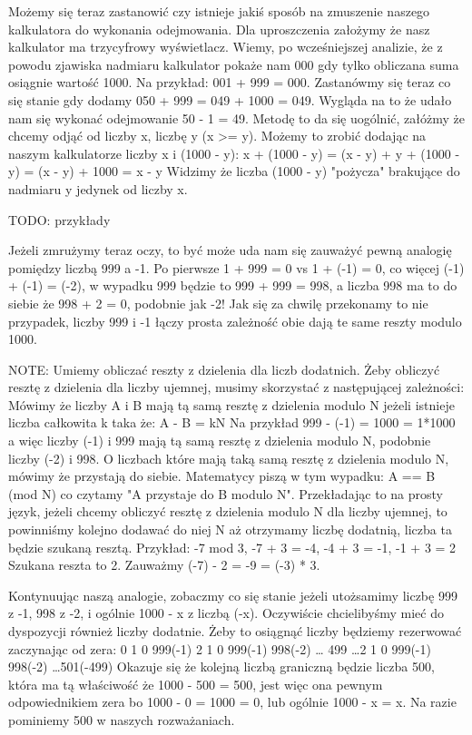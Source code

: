 Możemy się teraz zastanowić czy istnieje jakiś sposób na zmuszenie
naszego kalkulatora do wykonania odejmowania.
Dla uproszczenia założymy że nasz kalkulator ma trzycyfrowy wyświetlacz.
Wiemy, po wcześniejszej analizie, że z powodu zjawiska nadmiaru
kalkulator pokaże nam 000 gdy tylko obliczana suma osiągnie wartość 1000.
Na przykład: 001 + 999 = 000. Zastanówmy się teraz co się stanie 
gdy dodamy 050 + 999 = 049 + 1000 = 049. Wygląda na to że udało nam
się wykonać odejmowanie 50 - 1 = 49. Metodę to da się uogólnić,
załóżmy że chcemy odjąć od liczby x, liczbę y (x >= y). 
Możemy to zrobić dodając na naszym kalkulatorze liczby x i (1000 - y):
x + (1000 - y) = (x - y) + y + (1000 - y) = (x - y) + 1000 = x - y
Widzimy że liczba (1000 - y) "pożycza" brakujące do nadmiaru y jedynek od
liczby x.

TODO: przykłady

Jeżeli zmrużymy teraz oczy, to być może uda nam się zauważyć pewną
analogię pomiędzy liczbą 999 a -1. Po pierwsze
1 + 999 = 0 vs 1 + (-1) = 0,
co więcej (-1) + (-1) = (-2), w wypadku 999 będzie to
999 + 999 = 998,
a liczba 998 ma to do siebie że 998 + 2 = 0, podobnie jak -2!
Jak się za chwilę przekonamy to nie przypadek, liczby 999 i -1 łączy
prosta zależność obie dają te same reszty modulo 1000.

NOTE: Umiemy obliczać reszty z dzielenia dla liczb dodatnich.
Żeby obliczyć resztę z dzielenia dla liczby ujemnej, musimy 
skorzystać z następującej zależności: Mówimy że liczby A i B mają
tą samą resztę z dzielenia modulo N jeżeli istnieje liczba 
całkowita k taka że:
A - B = kN
Na przykład 999 - (-1) = 1000 = 1*1000 a więc liczby (-1) i
999 mają tą samą resztę z dzielenia modulo N, podobnie liczby (-2) i 998.
O liczbach które mają taką samą resztę z dzielenia modulo N,
mówimy że przystają do siebie. Matematycy piszą w tym wypadku:
A == B (mod N)
co czytamy "A przystaje do B modulo N".
Przekładając to na prosty język, jeżeli chcemy obliczyć resztę z
dzielenia modulo N dla liczby ujemnej, to powinniśmy
kolejno dodawać do niej N aż otrzymamy liczbę dodatnią,
liczba ta będzie szukaną resztą.
Przykład:
-7 mod 3, -7 + 3 = -4, -4 + 3 = -1, -1 + 3 = 2
Szukana reszta to 2. Zauważmy (-7) - 2 = -9 = (-3) * 3.

Kontynuując naszą analogie, zobaczmy co się stanie jeżeli
utożsamimy liczbę 999 z -1, 998 z -2, i ogólnie 1000 - x z liczbą (-x).
Oczywiście chcielibyśmy mieć do dyspozycji również liczby dodatnie.
Żeby to osiągnąć liczby będziemy rezerwować zaczynając od zera:
    0
  1 0 999(-1)
2 1 0 999(-1) 998(-2)
\dots
499 \dots 2 1 0 999(-1) 998(-2) \dots 501(-499)
Okazuje się że kolejną liczbą graniczną będzie liczba 500, która ma tą
właściwość że 1000 - 500 = 500, jest więc ona pewnym odpowiednikiem zera
bo 1000 - 0 = 1000 = 0, lub ogólnie 1000 - x = x.
Na razie pominiemy 500 w naszych rozważaniach.

